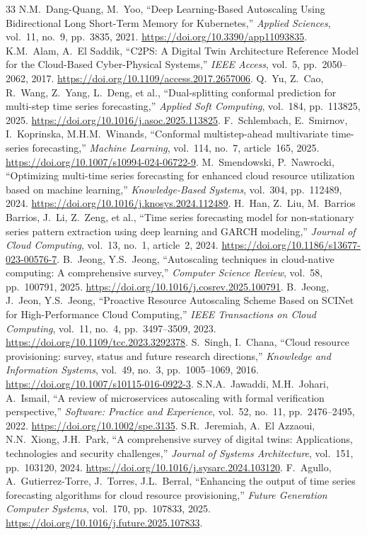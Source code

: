 \documentclass[10pt,twocolumn,a4paper]{article}
\begin{document}
\begin{thebibliography}{33}
 N.M.~Dang-Quang, M.~Yoo, ``Deep Learning-Based Autoscaling Using Bidirectional Long Short-Term Memory for Kubernetes,'' \emph{Applied Sciences}, vol.~11, no.~9, pp.~3835, 2021. \url{https://doi.org/10.3390/app11093835}.
 K.M.~Alam, A.~El Saddik, ``C2PS: A Digital Twin Architecture Reference Model for the Cloud-Based Cyber-Physical Systems,'' \emph{IEEE Access}, vol.~5, pp.~2050--2062, 2017. \url{https://doi.org/10.1109/access.2017.2657006}.
 Q.~Yu, Z.~Cao, R.~Wang, Z.~Yang, L.~Deng, et al., ``Dual-splitting conformal prediction for multi-step time series forecasting,'' \emph{Applied Soft Computing}, vol.~184, pp.~113825, 2025. \url{https://doi.org/10.1016/j.asoc.2025.113825}.
 F.~Schlembach, E.~Smirnov, I.~Koprinska, M.H.M.~Winands, ``Conformal multistep-ahead multivariate time-series forecasting,'' \emph{Machine Learning}, vol.~114, no.~7, article~165, 2025. \url{https://doi.org/10.1007/s10994-024-06722-9}.
 M.~Smendowski, P.~Nawrocki, ``Optimizing multi-time series forecasting for enhanced cloud resource utilization based on machine learning,'' \emph{Knowledge-Based Systems}, vol.~304, pp.~112489, 2024. \url{https://doi.org/10.1016/j.knosys.2024.112489}.
 H.~Han, Z.~Liu, M.~Barrios Barrios, J.~Li, Z.~Zeng, et al., ``Time series forecasting model for non-stationary series pattern extraction using deep learning and GARCH modeling,'' \emph{Journal of Cloud Computing}, vol.~13, no.~1, article~2, 2024. \url{https://doi.org/10.1186/s13677-023-00576-7}.
 B.~Jeong, Y.S.~Jeong, ``Autoscaling techniques in cloud-native computing: A comprehensive survey,'' \emph{Computer Science Review}, vol.~58, pp.~100791, 2025. \url{https://doi.org/10.1016/j.cosrev.2025.100791}.
 B.~Jeong, J.~Jeon, Y.S.~Jeong, ``Proactive Resource Autoscaling Scheme Based on SCINet for High-Performance Cloud Computing,'' \emph{IEEE Transactions on Cloud Computing}, vol.~11, no.~4, pp.~3497--3509, 2023. \url{https://doi.org/10.1109/tcc.2023.3292378}.
 S.~Singh, I.~Chana, ``Cloud resource provisioning: survey, status and future research directions,'' \emph{Knowledge and Information Systems}, vol.~49, no.~3, pp.~1005--1069, 2016. \url{https://doi.org/10.1007/s10115-016-0922-3}.
 S.N.A.~Jawaddi, M.H.~Johari, A.~Ismail, ``A review of microservices autoscaling with formal verification perspective,'' \emph{Software: Practice and Experience}, vol.~52, no.~11, pp.~2476--2495, 2022. \url{https://doi.org/10.1002/spe.3135}.
 S.R.~Jeremiah, A.~El Azzaoui, N.N.~Xiong, J.H.~Park, ``A comprehensive survey of digital twins: Applications, technologies and security challenges,'' \emph{Journal of Systems Architecture}, vol.~151, pp.~103120, 2024. \url{https://doi.org/10.1016/j.sysarc.2024.103120}.
 F.~Agullo, A.~Gutierrez-Torre, J.~Torres, J.L.~Berral, ``Enhancing the output of time series forecasting algorithms for cloud resource provisioning,'' \emph{Future Generation Computer Systems}, vol.~170, pp.~107833, 2025. \url{https://doi.org/10.1016/j.future.2025.107833}.
\end{thebibliography}
\end{document}
